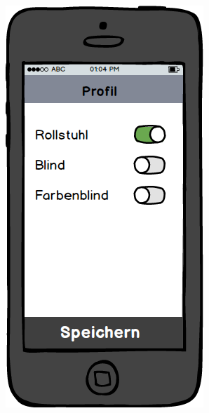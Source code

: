 \begin{figure}[h]
\begin{minipage}{.5\textwidth}
  \label{img:menu-mockup}
\end{minipage}%
\begin{minipage}{.5\textwidth}
  \centering
  \includegraphics[width=.8\linewidth]{img/profil-mockup.png}
  \label{img:profil-mockup}
\end{minipage}
\end{figure}

